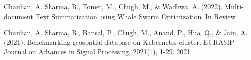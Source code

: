 
\begin{cvhonors}

  \cvhonor
    {Chauhan, A.} %
    {Sharma, B., Tomer, M., Chugh, M., \& Wadhwa, A. (2022). Multi-document Text Summarization using Whale Swarm Optimization.} %
    {In Review} %

  \cvhonor
    {Chauhan, A.} %
    {Sharma, B., Bansal, P., Chugh, M., Anand, P., Hua, Q., \& Jain, A. (2021). Benchmarking geospatial database on Kubernetes cluster. EURASIP Journal on Advances in Signal Processing, 2021(1), 1-29.} %
    {2021} %

\end{cvhonors}

